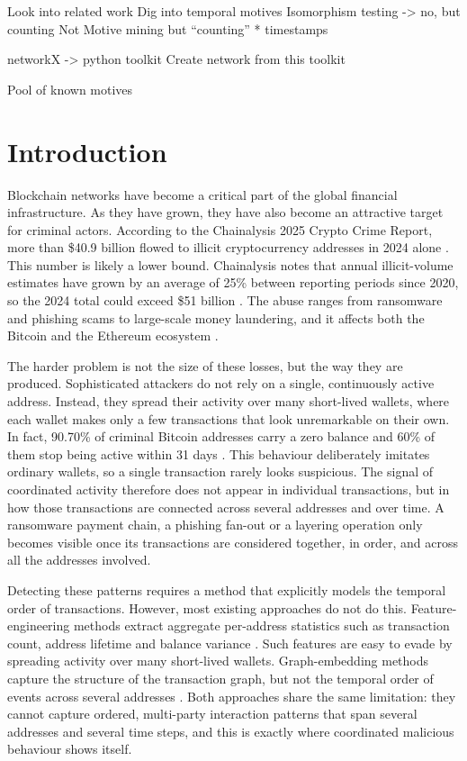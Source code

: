 \documentclass{thesisclass}
\begin{document}
Look into related work
Dig into temporal motives
Isomorphism testing -> no, but counting
Not Motive mining but “counting”
* timestamps

networkX -> python toolkit
Create network from this toolkit

Pool of known motives


\chapter{Introduction}
Blockchain networks have become a critical part of the global financial infrastructure. As they have grown, they have also become an attractive target for criminal actors. According to the Chainalysis 2025 Crypto Crime Report, more than \$40.9 billion flowed to illicit cryptocurrency addresses in 2024 alone \citep{chainalysis2025, shi2025realcats}. This number is likely a lower bound. Chainalysis notes that annual illicit-volume estimates have grown by an average of 25\% between reporting periods since 2020, so the 2024 total could exceed \$51 billion \citep{chainalysis2025}. The abuse ranges from ransomware and phishing scams to large-scale money laundering, and it affects both the Bitcoin and the Ethereum ecosystem \citep{shi2025realcats, sanjalawe2023atd}.

The harder problem is not the size of these losses, but the way they are produced. Sophisticated attackers do not rely on a single, continuously active address. Instead, they spread their activity over many short-lived wallets, where each wallet makes only a few transactions that look unremarkable on their own. In fact, 90.70\% of criminal Bitcoin addresses carry a zero balance and 60\% of them stop being active within 31 days \citep{shi2025realcats}. This behaviour deliberately imitates ordinary wallets, so a single transaction rarely looks suspicious. The signal of coordinated activity therefore does not appear in individual transactions, but in how those transactions are connected across several addresses and over time. A ransomware payment chain, a phishing fan-out or a layering operation only becomes visible once its transactions are considered together, in order, and across all the addresses involved.

Detecting these patterns requires a method that explicitly models the temporal order of transactions. However, most existing approaches do not do this. Feature-engineering methods extract aggregate per-address statistics such as transaction count, address lifetime and balance variance \citep{chen2022phishing, alemari2021labeled}. Such features are easy to evade by spreading activity over many short-lived wallets. Graph-embedding methods capture the structure of the transaction graph, but not the temporal order of events across several addresses \citep{shi2025realcats}. Both approaches share the same limitation: they cannot capture ordered, multi-party interaction patterns that span several addresses and several time steps, and this is exactly where coordinated malicious behaviour shows itself.
\end{document}
